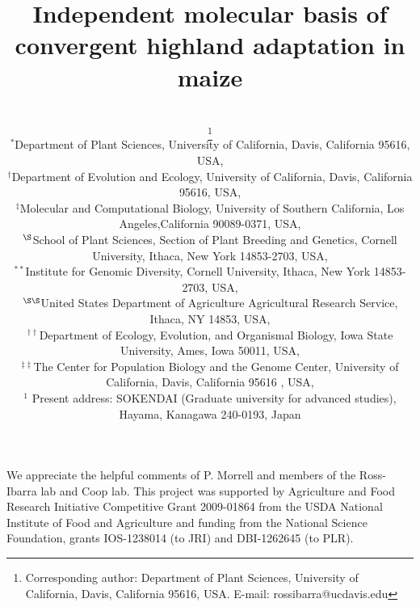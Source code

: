 \documentclass[twocolumn,twoside,letterpaper]{article}
\title{Independent molecular basis of convergent highland adaptation in maize}
\author{
 \small\sfbf{Shohei Takuno$^{\ast ,1}$, Peter Ralph$^{\dag, \ddag}$, Kelly Swarts$^{\S}$, Rob J. Elshire$^{\ast\ast}$, Jeffrey C. Glaubitz$^{\ast\ast}$,}\\
   \small\sfbf{Edward S. Buckler$^{\ast\ast, \S\S}$, Matthew B. Hufford$^{\ast, \dag\dag}$, and Jeffrey Ross-Ibarra$^{\ast,\ddag\ddag,}$}\thanks{
Corresponding author:  Department of Plant Sciences, University of California, Davis, California 95616, USA. 
    E-mail: \mbox{rossibarra@ucdavis.edu}}\\[0.3cm]
   \small\sf $^{\ast}$Department of Plant Sciences, University of California, Davis, California 95616, USA,\\
   \small\sf $^\dag$Department of Evolution and Ecology, University of California, Davis, California 95616, USA,\\
   \small\sf $^\ddag$Molecular and Computational Biology, University of Southern California,  Los Angeles,California 90089-0371, USA,\\
   \small\sf $^\S$School of Plant Sciences, Section of Plant Breeding and Genetics, Cornell University, Ithaca, New York 14853-2703, USA,\\
   \small\sf $^{\ast\ast}$Institute for Genomic Diversity, Cornell University, Ithaca, New York 14853-2703, USA,\\
   \small\sf $^{\S\S}$United States Department of Agriculture Agricultural Research Service, Ithaca,
NY 14853, USA,\\
   \small\sf $^{\dag\dag}$Department of Ecology, Evolution, and Organismal Biology, Iowa State University, Ames, Iowa 50011, USA,\\
   \small\sf $^{\ddag\ddag}$The Center for Population Biology and the Genome Center, University of California, Davis, California 95616 , USA,\\
   \small\sf $^1$ Present address: SOKENDAI (Graduate university for advanced studies), Hayama, Kanagawa 240-0193, Japan
}
\begin{document}
\maketitle









\begin{acknowledgments}
 We appreciate the helpful comments of P. Morrell and members of the Ross-Ibarra lab and Coop lab.   This project was supported by Agriculture and Food Research Initiative Competitive Grant 2009-01864 from the USDA National Institute of Food and Agriculture and funding from the National Science Foundation, grants IOS-1238014 (to JRI) and DBI-1262645 (to PLR).
\end{acknowledgments}




\suppl





 
\end{document}
